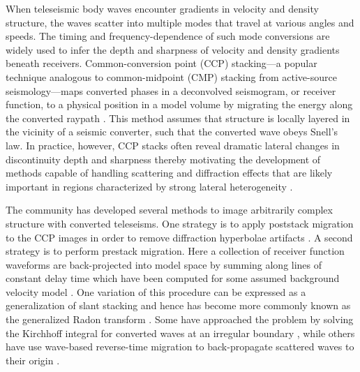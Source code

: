 \documentclass[referee]{gji}
\begin{document}
When teleseismic body waves encounter gradients in velocity and density structure, the waves scatter into multiple modes that travel at various angles and speeds.  The timing and frequency-dependence of such mode conversions are widely used to infer the depth and sharpness of velocity and density gradients beneath receivers.  Common-conversion point (CCP) stacking---a popular technique analogous to common-midpoint (CMP) stacking from active-source seismology---maps converted phases in a deconvolved seismogram, or receiver function, to a physical position in a model volume by migrating the energy along the converted raypath \citep{Dueker1997}.  This method assumes that structure is locally layered in the vicinity of a seismic converter, such that the converted wave obeys Snell's law.  In practice, however, CCP stacks often reveal dramatic lateral changes in discontinuity depth and sharpness \citep{Lekic2011a, Kind2013, Foster2014, Hansen2015, Hopper2015, Wang2016, Kind2017} thereby motivating the development of methods capable of handling scattering and diffraction effects that are likely important in regions characterized by strong lateral heterogeneity \citep[e.g.,][]{Lekic2017}.

The community has developed several methods to image arbitrarily complex structure with converted teleseisms.  One strategy is to apply poststack migration to the CCP images in order to remove diffraction hyperbolae artifacts \citep{Chen2005}.  A second strategy is to perform prestack migration.  Here a collection of receiver function waveforms are back-projected into model space by summing along lines of constant delay time which have been computed for some assumed background velocity model \citep{Revenaugh1995, Bostock1999, Ryberg2000, Sheehan2000, Poppeliers2003, Frederiksen2004, Cheng2016}.  One variation of this procedure can be expressed as a generalization of slant stacking and hence has become more commonly known as the generalized Radon transform \citep{Bostock2001, Rondenay2005}. Some have approached the problem by solving the Kirchhoff integral for converted waves at an irregular boundary \citep{Levander2005, Wilson2005}, while others have use wave-based reverse-time migration to back-propagate scattered waves to their origin \citep{Shang2012, Shang2017}.
\end{document}
